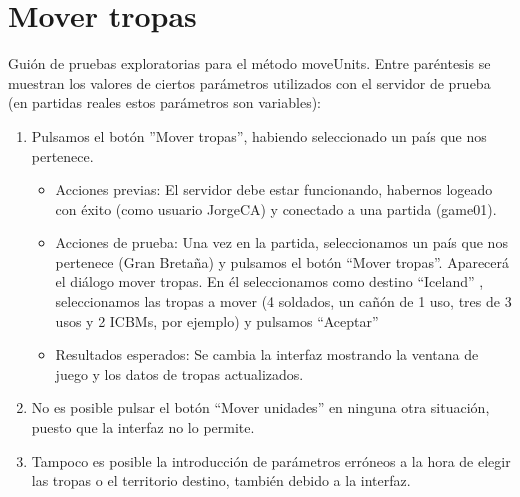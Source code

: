 \section{Mover tropas}

Guión de pruebas exploratorias para el método moveUnits. Entre paréntesis se muestran los valores de ciertos parámetros utilizados con el servidor de prueba (en partidas
reales estos parámetros son variables):


\begin{enumerate}
\item Pulsamos el botón ''Mover tropas'', habiendo seleccionado un país que nos pertenece.
	\begin{itemize}
	\item Acciones previas: El servidor debe estar funcionando, habernos logeado con éxito (como usuario JorgeCA) y conectado a una partida (game01).
	\item Acciones de prueba: Una vez en la  partida, seleccionamos un país que nos pertenece (Gran Bretaña) y pulsamos el botón ``Mover tropas''.
Aparecerá el diálogo mover tropas. En él seleccionamos como destino ``Iceland'' , seleccionamos las tropas a mover (4 soldados, un cañón de 1 uso, tres de 3 usos y 2 ICBMs, 
por ejemplo) y pulsamos ``Aceptar''
	\item Resultados esperados: Se cambia la interfaz mostrando la ventana de juego y los datos de tropas actualizados.
	\end{itemize}
\item No es posible pulsar el botón ``Mover unidades'' en ninguna otra situación, puesto que la interfaz no lo permite.
\item Tampoco es posible la introducción de parámetros erróneos a la hora de elegir las tropas o el territorio destino, también debido a la interfaz.

\end{enumerate}

